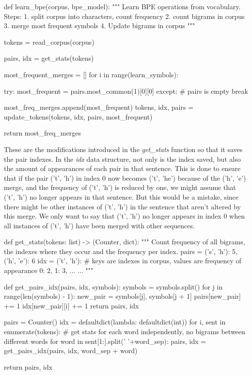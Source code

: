 \begin{python}
def learn_bpe(corpus, bpe_model):
  """
  Learn BPE operations from vocabulary.
  Steps:
  1. split corpus into characters, count frequency
  2. count bigrams in corpus
  3. merge most frequent symbols
  4. Update bigrams in corpus 
  """

  tokens = read_corpus(corpus)

  pairs, idx = get_stats(tokens)

  most_frequent_merges = []
  for i in range(learn_symbols):

    try:
      most_frequent = pairs.most_common(1)[0][0]
    except:
      # pairs is empty
      break

    most_freq_merges.append(most_frequent)
    tokens, idx, pairs = update_tokens(tokens, idx, pairs, most_frequent)

  return most_freq_merges
\end{python}

These are the modifications introduced in the \emph{get\_stats} function so that it saves the pair indexes. In the \emph{idx} data structure, not only is the index saved, but also the amount of appearances of each pair in that sentence. This is done to ensure that if the pair ('t', 'h') in index 0 now becomes ('t', 'he') because of the ('h', 'e') merge, and the frequency of ('t', 'h') is reduced by one, we might assume that ('t', 'h') no longer appears in that sentence. But this would be a mistake, since there might be other instances of ('t', 'h') in the sentence that aren't altered by this merge. We only want to say that ('t', 'h') no longer appears in index 0 when all instances of ('t', 'h') have been merged with other sequences.

\begin{python}
def get_stats(tokens: list) -> (Counter, dict):
  """
  Count frequency of all bigrams, the indexes where they occur and the frequency per index.
  pairs = {
      ('s', 'h'): 5,
      ('h', 'e'): 6
  }
  idx = {
      ('t', 'h'): {
          # keys are indexes in corpus, values are frequency of appearance
          0: 2,
          1: 3,
          ...
      }
      ...
  }
  """

  def get_pairs_idx(pairs, idx, symbols):
    symbols = symbols.split()
    for j in range(len(symbols) - 1):
      new_pair = symbols[j], symbols[j + 1]
      pairs[new_pair] += 1
      idx[new_pair][i] += 1
    return pairs, idx

  pairs = Counter()
  idx = defaultdict(lambda: defaultdict(int))
  for i, sent in enumerate(tokens):
    # get stats for each word independently, no bigrams between different words
    for word in sent[1:].split(' '+word_sep):
      pairs, idx = get_pairs_idx(pairs, idx, word_sep + word)

  return pairs, idx
\end{python}

